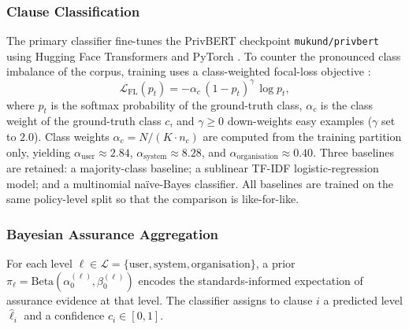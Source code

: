 \documentclass[final,3p,times,twocolumn]{elsarticle}
\begin{document}
	\subsubsection{Clause Classification}
	\label{sec:classifier} The primary classifier fine-tunes the PrivBERT
	checkpoint \texttt{mukund/privbert} \citep{srinath2021privaseer} using Hugging
	Face Transformers \citep{wolf2020transformers} and PyTorch \citep{paszke2019pytorch}.
	To counter the pronounced class imbalance of the corpus, training uses a class-weighted
	focal-loss objective \citep{lin2017focal}:
	\begin{equation}
		\mathcal{L}_{\text{FL}}(p_{t}) = -\alpha_{c} \,(1 - p_{t})^{\gamma}\, \log p_{t}
		, \label{eq:focal}
	\end{equation}
	where $p_{t}$ is the softmax probability of the ground-truth class, $\alpha_{c}$
	is the class weight of the ground-truth class $c$, and $\gamma \geq 0$ down-weights
	easy examples ($\gamma$ set to $2.0$). Class weights $\alpha_{c} = N / (K \cdot
	n_{c})$ are computed from the training partition only, yielding
	$\alpha_{\text{user}}\approx 2.84$, $\alpha_{\text{system}}\approx 8.28$, and
	$\alpha_{\text{organisation}}\approx 0.40$. Three baselines are retained: a
	majority-class baseline; a sublinear TF-IDF logistic-regression model; and a
	multinomial na\"ive-Bayes classifier. All baselines are trained on the same policy-level
	split so that the comparison is like-for-like.

	\subsubsection{Bayesian Assurance Aggregation}
	\label{sec:bayes} For each level $\ell \in \mathcal{L}= \{\text{user}, \text{system}
	, \text{organisation}\}$, a prior
	$\pi_{\ell} = \mathrm{Beta}(\alpha_{0}^{(\ell)}, \beta_{0}^{(\ell)})$ encodes
	the standards-informed expectation of assurance evidence at that level. The classifier
	assigns to clause $i$ a predicted level $\hat{\ell}_{i}$ and a confidence $c_{i}
	\in [0, 1]$.
\end{document}

